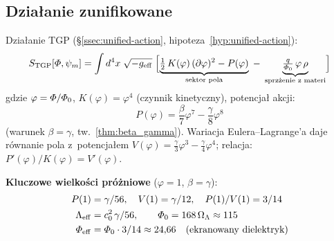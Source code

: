 \subsection*{Dzia\l{}anie zunifikowane}

Dzia\l{}anie TGP (\S\ref{ssec:unified-action}, hipoteza~\ref{hyp:unified-action}):
\begin{equation}\label{eq:S-TGP-summary}
S_{\mathrm{TGP}}[\Phi,\psi_m]
= \int d^4x\;\sqrt{-g_{\mathrm{eff}}}\;\Bigl[
  \underbrace{\tfrac{1}{2}\,K(\varphi)\,
  (\partial\varphi)^2 - P(\varphi)}_{\text{sektor pola}}
  \;-\;
  \underbrace{\tfrac{q}{\PhiZero}\,\varphi\,\rho}_{\text{sprz\k{e}\.zenie z~materi\k{a}}}
\Bigr]
\end{equation}
gdzie $\varphi = \varPhi/\varPhi_0$,\;
$K(\varphi) = \varphi^4$ (czynnik kinetyczny),\;
potencja\l{} akcji:
\begin{equation}\label{eq:P-action-summary}
P(\varphi) = \frac{\beta}{7}\varphi^7 - \frac{\gamma}{8}\varphi^8
\end{equation}
(warunek $\beta = \gamma$, tw.~\ref{thm:beta_gamma}).
Wariacja Eulera--Lagrange'a daje r\'ownanie pola z~potencja\l{}em
$V(\varphi) = \frac{\gamma}{3}\varphi^3 - \frac{\gamma}{4}\varphi^4$;
relacja: $P'(\varphi)/K(\varphi) = V'(\varphi)$.

\medskip\noindent
\textbf{Kluczowe wielko\'sci pr\'o\.zniowe} ($\varphi = 1$, $\beta = \gamma$):
\begin{align}
P(1) &= \gamma/56,\quad V(1) = \gamma/12,\quad P(1)/V(1) = 3/14 \label{eq:screening-ratio}\\
\Lambda_{\mathrm{eff}} &= c_0^2\,\gamma/56,\qquad
\varPhi_0 = 168\,\Omega_\Lambda \approx 115 \label{eq:Phi0-bare}\\
\varPhi_{\mathrm{eff}} &= \varPhi_0 \cdot 3/14 \approx 24{,}66
  \quad\text{(ekranowany dielektryk)} \label{eq:Phi-eff}
\end{align}

